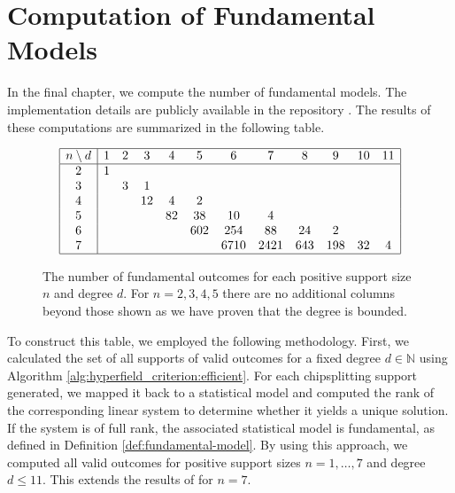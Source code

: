 \chapter{Computation of Fundamental Models}

In the final chapter, we compute the number of fundamental models. The implementation details are publicly available in the repository \cite{ducrepo}. The results of these computations are summarized in the following table.

\begin{figure}[H]
    \centering
    \[
    \begin{array}{|c|ccccccccccc|}
    \hline
    n \setminus d & 1 & 2 & 3 & 4 & 5 & 6 & 7 & 8 & 9 & 10 & 11 \\
    \hline
    2 & 1 &   &   &   &   &    &    &    &    &     &     \\
    3 &   & 3 & 1 &   &   &    &    &    &    &     &     \\
    4 &   &   & 12 & 4 & 2 &    &    &    &    &     &     \\
    5 &   &   &    & 82 & 38 & 10 & 4  &    &    &     &     \\
    6 &   &   &    &    & 602 & 254 & 88 & 24 & 2  &     &     \\
    7 &   &   &    &    &     & 6710 & 2421 & 643 & 198 & 32  & 4   \\
    \hline
    \end{array}
    \]
    \caption{The number of fundamental outcomes for each positive support size \( n \) and degree \( d \). For \( n = 2, 3, 4, 5 \) there are no additional columns beyond those shown as we have proven that the degree is bounded.}
    \label{table:computed-fundamental-models}
    \end{figure}


To construct this table, we employed the following methodology. First, we calculated the set of all supports of valid outcomes for a fixed degree \( d\in \mathbb{N} \) using Algorithm \ref{alg:hyperfield_criterion:efficient}. For each chipsplitting support generated, we mapped it back to a statistical model and computed the rank of the corresponding linear system to determine whether it yields a unique solution. If the system is of full rank, the associated statistical model is fundamental, as defined in Definition \ref{def:fundamental-model}. By using this approach, we computed all valid outcomes for positive support sizes \( n = 1, \dots, 7 \) and degree \( d \leq 11 \). This extends the results of \cite{bik2022classifying} for \( n =7 \).